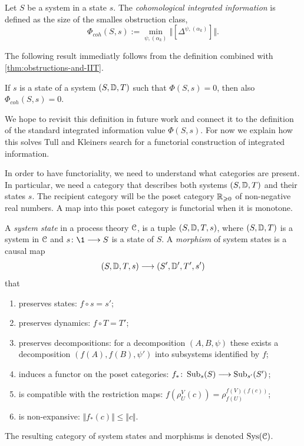 \begin{definition}
    Let $S$ be a system in a state $s$. The \emph{cohomological integrated information} is defined as the size of the smalles obstruction class, 
    \[\Phi_{coh}(S,s) := \min_{\psi, (\alpha_k)} \Vert [\Delta^{\psi, (\alpha_k)}]\Vert .\]
\end{definition}

The following result immediatly follows from the definition combined with \cref{thm:obstructions-and-IIT}. 

\begin{proposition}
    If $s$ is a state of a system $(S, \mathbb{D}, T)$ such that $\Phi(S,s) = 0$, then also $\Phi_{coh}(S,s)=0$.  
\end{proposition}

We hope to revisit this definition in future work and connect it to the definition of the standard integrated information value $\Phi(S,s)$. For now we explain how this solves Tull and Kleiners search for a functorial construction of integrated information. 

In order to have functoriality, we need to understand what categories are present. In particular, we need a category that describes both systems $(S, \mathbb{D}, T)$ and their states $s$. The recipient category will be the poset category $\mathbb{R}_{\geqslant 0}$ of non-negative real numbers. A map into this poset category is functorial when it is monotone. 

\begin{definition}
    A \emph{system state} in a process theory $\EuScript{C}$, is a tuple $(S,\mathbb{D}, T, s)$, where $(S, \mathbb{D}, T)$ is a system in $\EuScript{C}$ and $s\: \1 \to S$ is a state of $S$. A \emph{morphism} of system states is a causal map 
    \[(S, \mathbb{D}, T, s) \longrightarrow (S', \mathbb{D}', T', s')\]
    that
    \begin{enumerate}
        \item preserves states: $f \circ s = s'$;
        \item preserves dynamics: $f \circ T = T'$;
        \item preserves decompositions: for a decomposition $(A,B,\psi)$ these exists a decomposition $(f(A), f(B), \psi')$ into subsystems identified by $f$;
        \item induces a functor on the poset categories: $f_* \colon \operatorname{Sub}_s(S) \longrightarrow \operatorname{Sub}_{s'}(S')$;
        \item is compatible with the restriction maps: $f(\rho_U^V(c)) = \rho_{f(U)}^{f(V)(f(c))}$;
        \item is non-expansive: $\Vert f_*(c) \Vert \leq \Vert c \Vert$.
    \end{enumerate} 
    The resulting category of system states and morphisms is denoted $\operatorname{Sys}(\EuScript{C})$. 
\end{definition}

